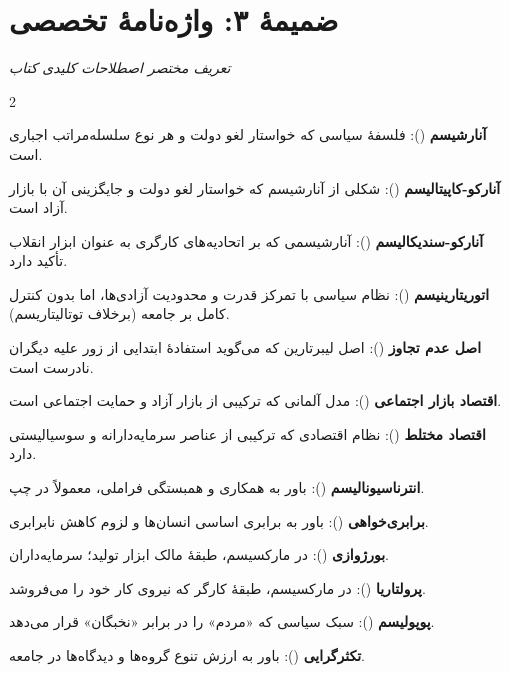 \chapter*{ضمیمهٔ ۳: واژه‌نامهٔ تخصصی}

\begin{center}
\textit{تعریف مختصر اصطلاحات کلیدی کتاب}
\end{center}

\vspace{5mm}

\begin{multicols}{2}

\textbf{آنارشیسم} (): فلسفهٔ سیاسی که خواستار لغو دولت و هر نوع سلسله‌مراتب اجباری است.

\textbf{آنارکو-کاپیتالیسم} (): شکلی از آنارشیسم که خواستار لغو دولت و جایگزینی آن با بازار آزاد است.

\textbf{آنارکو-سندیکالیسم} (): آنارشیسمی که بر اتحادیه‌های کارگری به عنوان ابزار انقلاب تأکید دارد.

\textbf{اتوریتارینیسم} (): نظام سیاسی با تمرکز قدرت و محدودیت آزادی‌ها، اما بدون کنترل کامل بر جامعه (برخلاف توتالیتاریسم).

\textbf{اصل عدم تجاوز} (): اصل لیبرتارین که می‌گوید استفادهٔ ابتدایی از زور علیه دیگران نادرست است.

\textbf{اقتصاد بازار اجتماعی} (): مدل آلمانی که ترکیبی از بازار آزاد و حمایت اجتماعی است.

\textbf{اقتصاد مختلط} (): نظام اقتصادی که ترکیبی از عناصر سرمایه‌دارانه و سوسیالیستی دارد.

\textbf{انترناسیونالیسم} (): باور به همکاری و همبستگی فراملی، معمولاً در چپ.

\textbf{برابری‌خواهی} (): باور به برابری اساسی انسان‌ها و لزوم کاهش نابرابری.

\textbf{بورژوازی} (): در مارکسیسم، طبقهٔ مالک ابزار تولید؛ سرمایه‌داران.

\textbf{پرولتاریا} (): در مارکسیسم، طبقهٔ کارگر که نیروی کار خود را می‌فروشد.

\textbf{پوپولیسم} (): سبک سیاسی که «مردم» را در برابر «نخبگان» قرار می‌دهد.

\textbf{تکثرگرایی} (): باور به ارزش تنوع گروه‌ها و دیدگاه‌ها در جامعه.


\end{multicols}
